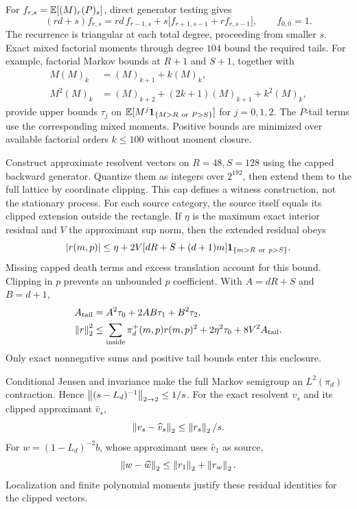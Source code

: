 For $f_{r,s}=\mathbb E[(M)_r(P)_s]$, direct generator testing gives
\begin{equation}
 (rd+s)f_{r,s}
 =rd\,f_{r-1,s}
       +s\big[f_{r+1,s-1}+r f_{r,s-1}\big],
 \qquad f_{0,0}=1.
 \label{eq:factorialrec}
\end{equation}
The recurrence is triangular at each total degree, proceeding from
smaller $s$. Exact mixed factorial moments through degree $104$
bound the required tails. For example, factorial Markov bounds at
$R+1$ and $S+1$, together with
\begin{align}
 M(M)_k&=(M)_{k+1}+k(M)_k,\nonumber\\
 M^2(M)_k&=(M)_{k+2}+(2k+1)(M)_{k+1}+k^2(M)_k,
\end{align}
provide upper bounds $\tau_j$ on
$\E[M^j\ind_{\{M>R\ {\rm or}\ P>S\}}]$ for $j=0,1,2$.
The $P$-tail terms use the corresponding mixed moments.
Positive bounds are minimized over available factorial orders
$k\leq100$ without moment closure.

Construct approximate resolvent vectors on $R=48,S=128$ using the
capped backward generator. Quantize them as integers over $2^{192}$,
then extend them to the full lattice by coordinate clipping. This cap
defines a witness construction, not the stationary process. For each
source category, the source itself equals its clipped extension outside
the rectangle. If $\eta$ is the maximum exact interior residual and
$V$ the approximant sup norm, then the extended residual obeys
\begin{equation}
 |r(m,p)|\leq\eta+
   2V[dR+S+(d+1)m]\mathbf 1_{\{m>R\ {\rm or}\ p>S\}}.
\end{equation}
Missing capped death terms and excess translation account for this
bound. Clipping in $p$ prevents an unbounded $p$ coefficient.
With $A=dR+S$ and $B=d+1$,
\begin{align}
 A_{\rm tail}&=A^2\tau_0+2AB\tau_1+B^2\tau_2,\nonumber\\
 \left\lVert r\right\rVert_2^2&\leq
 \sum_{\rm inside}\pi_d^+(m,p)r(m,p)^2
           +2\eta^2\tau_0+8V^2A_{\rm tail}.
 \label{eq:l2residual}
\end{align}
Only exact nonnegative sums and positive tail bounds enter this
enclosure.

Conditional Jensen and invariance make the full Markov semigroup an
$L^2(\pi_d)$ contraction. Hence
$\left\lVert (s-L_d)^{-1}\right\rVert_{2\to2}\leq1/s$. For the exact resolvent $v_s$
and its clipped approximant $\widehat v_s$,
\begin{equation}
 \left\lVert v_s-\widehat v_s\right\rVert_2\leq\left\lVert r_s\right\rVert_2/s.
\end{equation}
For $w=(1-L_d)^{-2}b$, whose approximant uses $\widehat v_1$ as source,
\begin{equation}
 \left\lVert w-\widehat w\right\rVert_2\leq\left\lVert r_1\right\rVert_2+\left\lVert r_w\right\rVert_2.
\end{equation}
Localization and finite polynomial moments justify these residual
identities for the clipped vectors.

